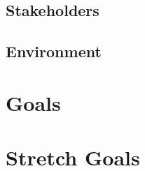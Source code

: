 \documentclass{article}
\begin{document}
\subsection{Stakeholders}

\subsection{Environment}


\section{Goals}

\section{Stretch Goals}
\end{document}
